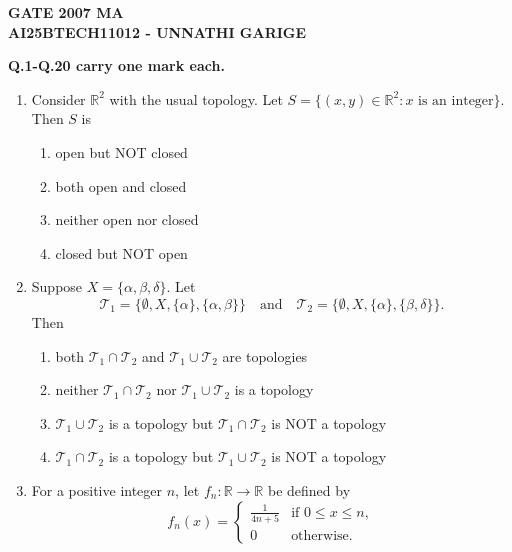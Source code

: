 \documentclass[journal]{IEEEtran}
\numberwithin{equation}{enumi}
\numberwithin{figure}{enumi}
\begin{document}




\begin{center}
    \LARGE \textbf{GATE 2007 MA}\\[0.5em]
    \large \textbf{AI25BTECH11012 - UNNATHI GARIGE}
\end{center}




\begin{center}
 \textbf{Q.1-Q.20 carry one mark each.}
\end{center}
\vspace{0.25em}

\begin{enumerate}
   

\item Consider $\mathbb{R}^2$ with the usual topology. Let $S = \{(x, y) \in \mathbb{R}^2 : x \text{ is an integer} \}$. Then $S$ is  

\hfill{}
\begin{enumerate} 
    \item open but NOT closed
    \item both open and closed
    \item neither open nor closed
    \item closed but NOT open
\end{enumerate}


\item Suppose $X = \{ \alpha, \beta, \delta \}$. Let
\[
\mathcal{T}_1 = \{\emptyset, X, \{\alpha\}, \{\alpha, \beta\} \} \quad \text{and} \quad \mathcal{T}_2 = \{\emptyset, X, \{\alpha\}, \{\beta, \delta\} \}.
\]
Then
\hfill{}
\begin{enumerate}
     \item both $\mathcal{T}_1 \cap \mathcal{T}_2$ and $\mathcal{T}_1 \cup \mathcal{T}_2$ are topologies
    \item neither $\mathcal{T}_1 \cap \mathcal{T}_2$ nor $\mathcal{T}_1 \cup \mathcal{T}_2$ is a topology
    \item $\mathcal{T}_1 \cup \mathcal{T}_2$ is a topology but $\mathcal{T}_1 \cap \mathcal{T}_2$ is NOT a topology
    \item $\mathcal{T}_1 \cap \mathcal{T}_2$ is a topology but $\mathcal{T}_1 \cup \mathcal{T}_2$ is NOT a topology
\end{enumerate}

\item For a positive integer $n$, let $f_n : \mathbb{R} \to \mathbb{R}$ be defined by
\[
f_n(x) = 
\begin{cases}
\frac{1}{4n + 5} & \text{if } 0 \leq x \leq n, \\
0 & \text{otherwise}.
\end{cases}
\]


\end{enumerate}
\end{document}
